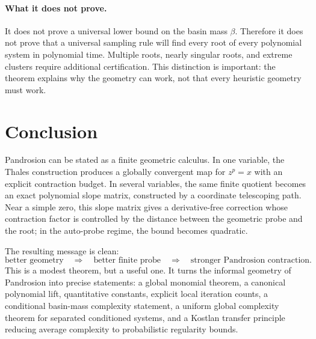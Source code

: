 \documentclass[11pt]{article}
\theoremstyle{definition}
\theoremstyle{remark}
\begin{document}
\paragraph{What it does not prove.}
It does not prove a universal lower bound on the basin mass $\beta$.  Therefore it does not prove that a universal sampling rule will find every root of every polynomial system in polynomial time.  Multiple roots, nearly singular roots, and extreme clusters require additional certification.  This distinction is important: the theorem explains why the geometry can work, not that every heuristic geometry must work.

\section{Conclusion}

Pandrosion can be stated as a finite geometric calculus.  In one variable, the Thales construction produces a globally convergent map for $z^p=x$ with an explicit contraction budget.  In several variables, the same finite quotient becomes an exact polynomial slope matrix, constructed by a coordinate telescoping path.  Near a simple zero, this slope matrix gives a derivative-free correction whose contraction factor is controlled by the distance between the geometric probe and the root; in the auto-probe regime, the bound becomes quadratic.

The resulting message is clean:
\[
        \text{better geometry}\quad\Longrightarrow\quad
        \text{better finite probe}\quad\Longrightarrow\quad
        \text{stronger Pandrosion contraction.}
\]
This is a modest theorem, but a useful one.  It turns the informal geometry of Pandrosion into precise statements: a global monomial theorem, a canonical polynomial lift, quantitative constants, explicit local iteration counts, a conditional basin-mass complexity statement, a uniform global complexity theorem for separated conditioned systems, and a Kostlan transfer principle reducing average complexity to probabilistic regularity bounds.
\end{document}
